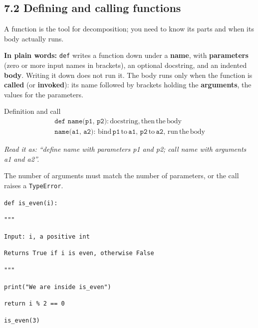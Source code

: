 \documentclass[11pt]{article}
\begin{document}
\begin{keepsection}
\section{7.2 Defining and calling functions}

A function is the tool for decomposition; you need to know its parts and when its body actually runs.

\begin{plainbox}\textbf{In plain words:} \texttt{def} writes a function down under a \textbf{name}, with \textbf{parameters} (zero or more input names in brackets), an optional docstring, and an indented \textbf{body}. Writing it down does not run it. The body runs only when the function is \textbf{called} (or \textbf{invoked}): its name followed by brackets holding the \textbf{arguments}, the values for the parameters.\end{plainbox}

\begin{equationcard}{Definition and call}
\[ \begin{gathered} \texttt{def name(p1, p2):}\, \text{docstring},\, \text{then}\, \text{the}\, \text{body} \\ \texttt{name(a1, a2)}:\, \text{bind}\, \texttt{p1}\, \text{to}\, \texttt{a1},\, \texttt{p2}\, \text{to}\, \texttt{a2},\, \text{run}\, \text{the}\, \text{body} \end{gathered} \]
{\small \emph{Read it as: “define name with parameters p1 and p2; call name with arguments a1 and a2”.}\par  The number of arguments must match the number of parameters, or the call raises a \texttt{TypeError}.}
\end{equationcard}
\begin{tcolorbox}[colback=Paperblue,colframe=Paperblue,boxrule=0pt,arc=0pt,left=7pt,right=7pt,top=5pt,bottom=5pt]\small\sloppy
\noindent\hspace*{0em}\texttt{def is\_even(i):}\par
\noindent\hspace*{1em}\texttt{"""}\par
\noindent\hspace*{1em}\texttt{Input: i, a positive int}\par
\noindent\hspace*{1em}\texttt{Returns True if i is even, otherwise False}\par
\noindent\hspace*{1em}\texttt{"""}\par
\noindent\hspace*{1em}\texttt{print("We are inside is\_even")}\par
\noindent\hspace*{1em}\texttt{return i \% 2 == 0}\par
\noindent\hspace*{0em}\texttt{}\par
\noindent\hspace*{0em}\texttt{is\_even(3)}\par
\end{tcolorbox}


\end{keepsection}
\end{document}
